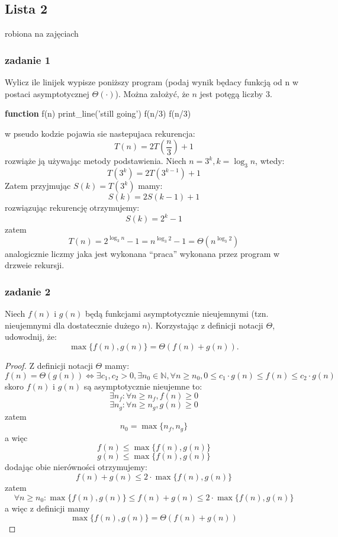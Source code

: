 \documentclass[11pt,a4paper]{article}
\begin{document}
\subsection{Lista 2}
robiona na zajęciach \date{2025-03-10}
\subsubsection{zadanie 1}
Wylicz ile linijek wypisze poniższy program (podaj wynik będacy funkcją od n w postaci asymptotycznej $\Theta(\cdot)$). Można założyć, że $n$ jest potęgą liczby $3$.
\begin{algorithm}
\begin{algorithmic}[1]
\State \textbf{function} f(n)
    \State print\_line('still going')
    \State f(n/3)
    \State f(n/3)
\EndIf
\end{algorithmic}
\end{algorithm}
w pseudo kodzie pojawia sie nastepujaca rekurencja:
\[
    T(n) = 2T(\frac{n}{3}) + 1
\]
rozwiąże ją używając metody podstawienia. Niech $n=3^k, k = \log_3 n$, wtedy:
\[
    T(3^k) = 2T(3^{k-1}) + 1
\]
Zatem przyjmując $S(k) = T(3^k)$ mamy:
\[
    S(k) = 2S(k-1) + 1
\]
rozwiązując rekurencję otrzymujemy:
\[
    S(k) = 2^k - 1
\]
zatem
\[
    T(n) = 2^{\log_3 n} - 1 = n^{\log_3 2} - 1 = \Theta(n^{\log_3 2})
\]
analogicznie liczmy jaka jest wykonana ``praca'' wykonana przez program w drzweie rekursji.

\subsubsection{zadanie 2}
Niech $f(n)$ i $g(n)$ będą funkcjami asymptotycznie nieujemnymi (tzn. nieujemnymi dla dostatecznie dużego $n$). Korzystając z definicji notacji $\Theta$, udowodnij, że:
\[
\max\{f(n), g(n)\} = \Theta(f(n) + g(n)).
\]
\begin{proof}
    Z definicji notacji $\Theta$ mamy:
    \[
        f(n)=\Theta(g(n)) \iff \exists c_1, c_2 > 0, \exists n_0 \in \mathbb{N}, \forall n \geq n_0, 0 \leq c_1 \cdot g(n) \leq f(n) \leq c_2 \cdot g(n)
    \]
    skoro $f(n)$ i $g(n)$ są asymptotycznie nieujemne to:
    \[
        \exists n_f: \forall n \geq n_f, f(n) \geq 0
    \]
    \[
        \exists n_g: \forall n \geq n_g, g(n) \geq 0
    \]
    zatem
    \[
        n_0=\max\{n_f, n_g\}
    \]
    a więc
    \[
        f(n) \leq \max\{f(n), g(n)\}
    \]
    \[
        g(n) \leq \max\{f(n), g(n)\}
    \]
    dodając obie nierówności otrzymujemy:
    \[
        f(n) + g(n) \leq 2 \cdot \max\{f(n), g(n)\}
    \]
    zatem
    \[
        \forall n \geq n_0: \max\{f(n), g(n)\} \leq f(n) + g(n) \leq 2 \cdot \max\{f(n), g(n)\}
    \]
    a więc z definicji mamy
    \[
        \max\{f(n), g(n)\} = \Theta(f(n) + g(n))
    \]
\end{proof}
\end{document}
